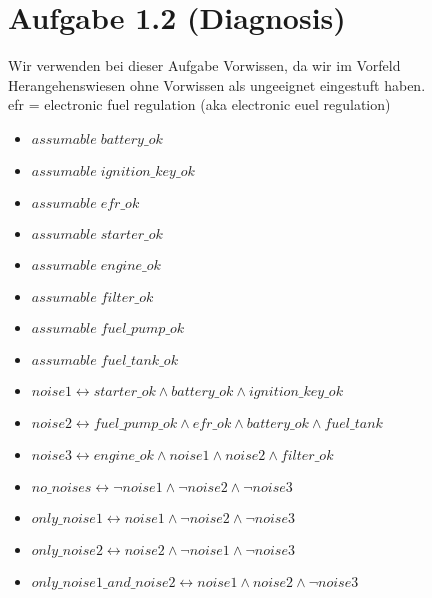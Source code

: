 \documentclass[a4paper,10pt]{article}
\begin{document}
\section*{Aufgabe 1.2 (Diagnosis)}
Wir verwenden bei dieser Aufgabe Vorwissen, da wir im Vorfeld Herangehenswiesen ohne Vorwissen als ungeeignet eingestuft haben. \\
efr = electronic fuel regulation (aka electronic euel regulation)
\begin{itemize}
  \item $assumable \; battery\_ok$
  \item $assumable \; ignition\_key\_ok$
  \item $assumable \; efr\_ok$
  \item $assumable \; starter\_ok$
  \item $assumable \; engine\_ok$
  \item $assumable \; filter\_ok$
  \item $assumable \; fuel\_pump\_ok$
  \item $assumable \; fuel\_tank\_ok$
  \item $noise1 \leftrightarrow starter\_ok \wedge battery\_ok \wedge ignition\_key\_ok$
  \item $noise2 \leftrightarrow fuel\_pump\_ok \wedge efr\_ok \wedge battery\_ok \wedge fuel\_tank$
  \item $noise3 \leftrightarrow engine\_ok \wedge noise1 \wedge noise2 \wedge filter\_ok$
  \item $no\_noises \leftrightarrow \neg noise1 \wedge \neg noise2 \wedge \neg noise3$
  \item $only\_noise1 \leftrightarrow noise1 \wedge \neg noise2 \wedge \neg noise3$
  \item $only\_noise2 \leftrightarrow noise2 \wedge \neg noise1 \wedge \neg noise3$
  \item $only\_noise1\_and\_noise2 \leftrightarrow noise1 \wedge noise2 \wedge \neg noise3$
\end{itemize}
\end{document}
